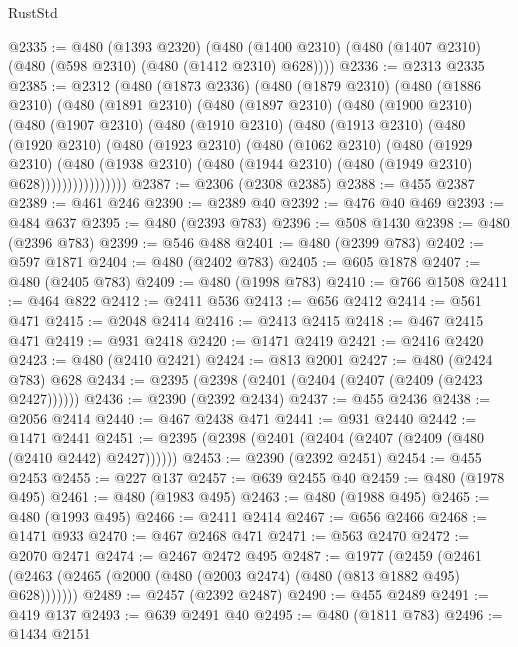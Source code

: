 \begin{lexlean}{RustStd}
\begin{coremodule}
@2335 := @480
    (@1393 @2320)
    (@480 (@1400 @2310) (@480 (@1407 @2310) (@480 (@598 @2310) (@480 (@1412 @2310) @628))))
@2336 := @2313 @2335
@2385 := @2312
    (@480
      (@1873 @2336)
      (@480
        (@1879 @2310)
        (@480
          (@1886 @2310)
          (@480
            (@1891 @2310)
            (@480
              (@1897 @2310)
              (@480
                (@1900 @2310)
                (@480
                  (@1907 @2310)
                  (@480
                    (@1910 @2310)
                    (@480
                      (@1913 @2310)
                      (@480
                        (@1920 @2310)
                        (@480
                          (@1923 @2310)
                          (@480
                            (@1062 @2310)
                            (@480
                              (@1929 @2310)
                              (@480
                                (@1938 @2310)
                                (@480 (@1944 @2310) (@480 (@1949 @2310) @628))))))))))))))))
@2387 := @2306 (@2308 @2385)
@2388 := @455 @2387
@2389 := @461 @246
@2390 := @2389 @40
@2392 := @476 @40 @469
@2393 := @484 @637
@2395 := @480 (@2393 @783)
@2396 := @508 @1430
@2398 := @480 (@2396 @783)
@2399 := @546 @488
@2401 := @480 (@2399 @783)
@2402 := @597 @1871
@2404 := @480 (@2402 @783)
@2405 := @605 @1878
@2407 := @480 (@2405 @783)
@2409 := @480 (@1998 @783)
@2410 := @766 @1508
@2411 := @464 @822
@2412 := @2411 @536
@2413 := @656 @2412
@2414 := @561 @471
@2415 := @2048 @2414
@2416 := @2413 @2415
@2418 := @467 @2415 @471
@2419 := @931 @2418
@2420 := @1471 @2419
@2421 := @2416 @2420
@2423 := @480 (@2410 @2421)
@2424 := @813 @2001
@2427 := @480 (@2424 @783) @628
@2434 := @2395 (@2398 (@2401 (@2404 (@2407 (@2409 (@2423 @2427))))))
@2436 := @2390 (@2392 @2434)
@2437 := @455 @2436
@2438 := @2056 @2414
@2440 := @467 @2438 @471
@2441 := @931 @2440
@2442 := @1471 @2441
@2451 := @2395 (@2398 (@2401 (@2404 (@2407 (@2409 (@480 (@2410 @2442) @2427))))))
@2453 := @2390 (@2392 @2451)
@2454 := @455 @2453
@2455 := @227 @137
@2457 := @639 @2455 @40
@2459 := @480 (@1978 @495)
@2461 := @480 (@1983 @495)
@2463 := @480 (@1988 @495)
@2465 := @480 (@1993 @495)
@2466 := @2411 @2414
@2467 := @656 @2466
@2468 := @1471 @933
@2470 := @467 @2468 @471
@2471 := @563 @2470
@2472 := @2070 @2471
@2474 := @2467 @2472 @495
@2487 := @1977
    (@2459 (@2461 (@2463 (@2465 (@2000 (@480 (@2003 @2474) (@480 (@813 @1882 @495) @628)))))))
@2489 := @2457 (@2392 @2487)
@2490 := @455 @2489
@2491 := @419 @137
@2493 := @639 @2491 @40
@2495 := @480 (@1811 @783)
@2496 := @1434 @2151

\end{coremodule}
\end{lexlean}
